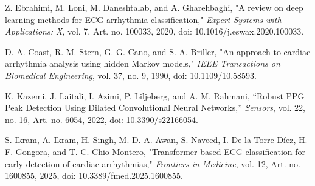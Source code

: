 \documentclass{citask}
\begin{document}
\begin{thebibliography}{1}
Z. Ebrahimi, M. Loni, M. Daneshtalab, and A. Gharehbaghi, "A review on deep learning methods for ECG arrhythmia classification," \emph{Expert Systems with Applications: X}, vol. 7, Art. no. 100033, 2020, doi: 10.1016/j.eswax.2020.100033.

D. A. Coast, R. M. Stern, G. G. Cano, and S. A. Briller, "An approach to cardiac arrhythmia analysis using hidden Markov models," \emph{IEEE Transactions on Biomedical Engineering}, vol. 37, no. 9, 1990, doi: 10.1109/10.58593.

K. Kazemi, J. Laitali, I. Azimi, P. Liljeberg, and A. M. Rahmani, “Robust PPG Peak Detection Using Dilated Convolutional Neural Networks,” \emph{Sensors}, vol. 22, no. 16, Art. no. 6054, 2022, doi: 10.3390/s22166054.

S. Ikram, A. Ikram, H. Singh, M. D. A. Awan, S. Naveed, I. De la Torre Díez, H. F. Gongora, and T. C. Chio Montero, "Transformer-based ECG classification for early detection of cardiac arrhythmias," \emph{Frontiers in Medicine}, vol. 12, Art. no. 1600855, 2025, doi: 10.3389/fmed.2025.1600855.


\end{thebibliography}
\end{document}

